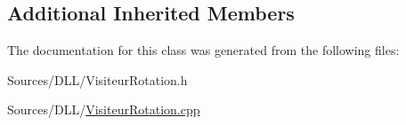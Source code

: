 \subsection*{Additional Inherited Members}


The documentation for this class was generated from the following files\+:\begin{DoxyCompactItemize}
\item 
Sources/\+D\+L\+L/Visiteur\+Rotation.\+h\item 
Sources/\+D\+L\+L/\hyperlink{_visiteur_rotation_8cpp}{Visiteur\+Rotation.\+cpp}\end{DoxyCompactItemize}
